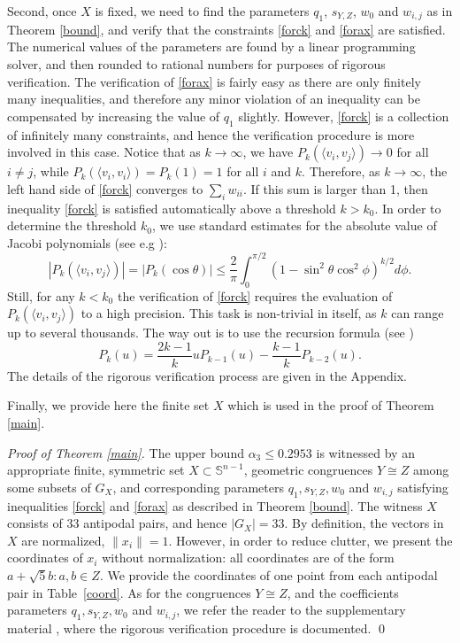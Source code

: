\documentclass[11pt]{amsart}
\numberwithin{equation}{section}
\newcommand{\Sp}{\mathbb S}
\begin{document}
\medskip

Second, once $X$ is fixed, we need to find the parameters  $q_1$, $s_{Y,Z}$, $w_0$ and $w_{i,j}$ as in Theorem \ref{bound}, and verify that the constraints \eqref{forck} and \eqref{forax} are satisfied. The numerical values of the parameters are found by a linear programming solver, and then rounded to rational numbers for purposes of rigorous verification. The verification of \eqref{forax} is fairly easy as there are only finitely many inequalities, and therefore any minor violation of an inequality can be compensated by increasing the value of $q_1$ slightly. However, \eqref{forck} is a collection of infinitely many constraints, and hence the verification procedure is more involved in this case. Notice that as $k\to \infty$, we have  $P_k(\langle v_i, v_j \rangle ) \to 0$ for all $i\ne j$, while $P_k(\langle v_i, v_i \rangle )=P_k(1)=1$ for all $i$ and $k$. Therefore, as $k\to \infty$, the left hand side of \eqref{forck} converges to $\sum_iw_{ii}$. If this sum is larger than 1, then inequality \eqref{forck} is satisfied  automatically above a threshold $k>k_0$. In order to determine the threshold $k_0$, we use standard estimates for the absolute value of Jacobi polynomials (see e.g \cite{dov}):
\begin{equation}\label{integral}
|P_k(\langle v_i, v_j \rangle )|=|P_k(\cos \theta )|\le \frac{2}{\pi}\int_0^{\pi/2} (1-\sin^2 \theta \cos^2 \phi )^{k/2}d\phi.
\end{equation}
Still, for any $k<k_0$ the verification of \eqref{forck} requires the evaluation of $P_k(\langle v_i, v_j \rangle )$ to a high precision. This task is non-trivial in itself, as $k$ can range up to several thousands. The way out is to use the recursion formula (see \cite{szego})
\begin{equation}\label{recursion}
P_k(u)=\frac{2k-1}{k}uP_{k-1}(u)-\frac{k-1}{k}P_{k-2}(u).    
\end{equation}
The details of the rigorous verification process are given in the Appendix. 

\medskip

Finally, we provide here the finite set $X$ which is used in the proof of Theorem \ref{main}. 

\medskip

{\it Proof of Theorem \ref{main}.} The upper bound $\alpha_3\le 0.2953$ is witnessed by an appropriate finite, symmetric set $X\subset \Sp^{n-1}$, geometric congruences $Y\cong Z$ among some subsets of $G_X$,  and corresponding parameters $q_1, s_{Y,Z}, w_0$ and $w_{i,j}$ satisfying inequalities \eqref{forck} and \eqref{forax} as described in Theorem \ref{bound}. The witness $X$ consists of 33 antipodal pairs, and hence $|G_X|=33$. By definition, the vectors in $X$ are normalized, $\|x_i\|=1$. However, in order to reduce clutter, we present the coordinates of $x_i$ without normalization: all coordinates are of the form $a + \sqrt{5}b: a, b \in Z$. We provide the coordinates of one point from each antipodal pair in Table~\ref{coord}. As for the congruences $Y\cong Z$, and the coefficients parameters $q_1, s_{Y,Z}, w_0$ and $w_{i,j}$, we refer the reader to the supplementary material \cite{supplementary}, where the rigorous verification procedure is documented. \qed
\end{document}
